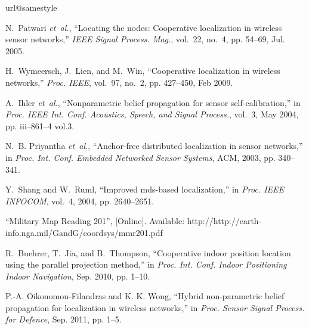 \documentclass[10pt, final, journal]{IEEEtran}
\begin{document}
\begin{thebibliography}{10}
\providecommand{\url}[1]{#1}
\csname url@samestyle\endcsname
\providecommand{\newblock}{\relax}
\providecommand{\bibinfo}[2]{#2}
\providecommand{\BIBentrySTDinterwordspacing}{\spaceskip=0pt\relax}
\providecommand{\BIBentryALTinterwordstretchfactor}{4}
\providecommand{\BIBentryALTinterwordspacing}{\spaceskip=\fontdimen2\font plus
\BIBentryALTinterwordstretchfactor\fontdimen3\font minus
  \fontdimen4\font\relax}
\providecommand{\BIBforeignlanguage}[2]{{\expandafter\ifx\csname l@#1\endcsname\relax
\typeout{** WARNING: IEEEtran.bst: No hyphenation pattern has been}\typeout{** loaded for the language `#1'. Using the pattern for}\typeout{** the default language instead.}\else
\language=\csname l@#1\endcsname
\fi
#2}}
\providecommand{\BIBdecl}{\relax}
\BIBdecl

N.~Patwari \emph{et~al.}, ``Locating the nodes: Cooperative localization in wireless sensor networks,'' \emph{IEEE Signal Process. Mag.}, vol.~22, no.~4, pp. 54--69, Jul. 2005.

H.~Wymeersch, J.~Lien, and M.~Win, ``Cooperative localization in wireless networks,'' \emph{Proc. IEEE}, vol.~97, no.~2, pp. 427--450, Feb 2009.



A.~Ihler \emph{et~al.}, ``Nonparametric belief propagation for sensor self-calibration,'' in \emph{Proc. IEEE Int. Conf. Acoustics, Speech, and Signal Process.}, vol.~3, May 2004, pp. iii--861--4 vol.3.

N.~B. Priyantha \emph{et~al.}, ``Anchor-free distributed localization in sensor networks,'' in \emph{Proc. Int. Conf. Embedded Networked Sensor Systems}, ACM, 2003, pp. 340--341.

Y.~Shang and W.~Ruml, ``Improved mds-based localization,'' in \emph{Proc. IEEE INFOCOM}, vol.~4, 2004, pp. 2640--2651.


``Military Map Reading 201'', [Online]. Available: http://http://earth-info.nga.mil/GandG/coordsys/mmr201.pdf

R.~Buehrer, T.~Jia, and B.~Thompson, ``Cooperative indoor position location using the parallel projection method,'' in \emph{Proc. Int. Conf. Indoor Positioning Indoor Navigation}, Sep. 2010, pp. 1--10.

P.-A. Oikonomou-Filandras and K. K. Wong, ``Hybrid non-parametric belief propagation for localization in wireless networks,'' in \emph{Proc. Sensor Signal Process. for Defence}, Sep. 2011, pp. 1--5.


\end{thebibliography}
\end{document}

